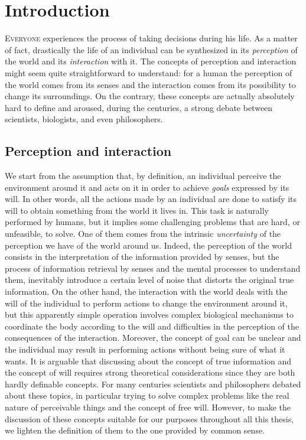 \chapter{Introduction}\label{C:intro}
\lettrine{E}{veryone} experiences the process of taking decisions during his life. As a matter of fact, drastically the life of an individual can be synthesized in its \textit{perception} of the world and its \textit{interaction} with it. The concepts of perception and interaction might seem quite straightforward to understand: for a human the perception of the world comes from its senses and the interaction comes from its possibility to change its surroundings. On the contrary, these concepts are actually absolutely hard to define and aroused, during the centuries, a strong debate between scientists, biologists, and even philosophers.

\section{Perception and interaction}
We start from the assumption that, by definition, an individual perceive the environment around it and acts on it in order to achieve \textit{goals} expressed by its will. In other words, all the actions made by an individual are done to satisfy its will to obtain something from the world it lives in. This task is naturally performed by humans, but it implies some challenging problems that are hard, or unfeasible, to solve. One of them comes from the intrinsic \textit{uncertainty} of the perception we have of the world around us. Indeed, the perception of the world consists in the interpretation of the information provided by senses, but the process of information retrieval by senses and the mental processes to understand them, inevitably introduce a certain level of noise that distorts the original true information. On the other hand, the interaction with the world deals with the will of the individual to perform actions to change the environment around it, but this apparently simple operation involves complex biological mechanisms to coordinate the body according to the will and difficulties in the perception of the consequences of the interaction. Moreover, the concept of goal can be unclear and the individual may result in performing actions without being sure of what it wants.
It is arguable that discussing about the concept of true information and the concept of will requires strong theoretical considerations since they are both hardly definable concepts. For many centuries scientists and philosophers debated about these topics, in particular trying to solve complex problems like the real nature of perceivable things and the concept of free will. However, to make the discussion of these concepts suitable for our purposes throughout all this thesis, we lighten the definition of them to the one provided by common sense.

